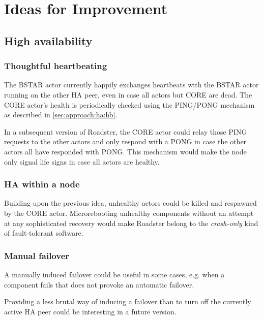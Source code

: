 \section{Ideas for Improvement}
\subsection{High availability}

\subsubsection{Thoughtful heartbeating}\label{sec:discussion:imp:ha:hb}
The BSTAR actor currently happily exchanges heartbeats with the BSTAR actor
running on the other HA peer, even in case all actors but CORE are dead. The
CORE actor's health is periodically checked using the PING/PONG mechanism as
described in \autoref{sec:approach:ha:hb}.

In a subsequent version of Roadster, the CORE actor could relay those PING
requests to the other actors and only respond with a PONG in case the other
actors all have responded with PONG. This mechanism would make the node only
signal life signs in case all actors are healthy.

\subsubsection{HA within a node}
Building upon the previous idea, unhealthy actors could be killed and respawned
by the CORE actor.  Microrebooting unhealthy components without an attempt at
any sophisticated recovery would make Roadster belong to the \emph{crash-only} kind of fault-tolerant software.

\subsubsection{Manual failover}\label{sec:discussion:ha:manual-failover}
A manually induced failover could be useful in some cases, e.g. when a
component fails that does not provoke an automatic failover.

Providing a less brutal way of inducing a failover than to turn off the
currently active HA peer could be interesting in a future version.

